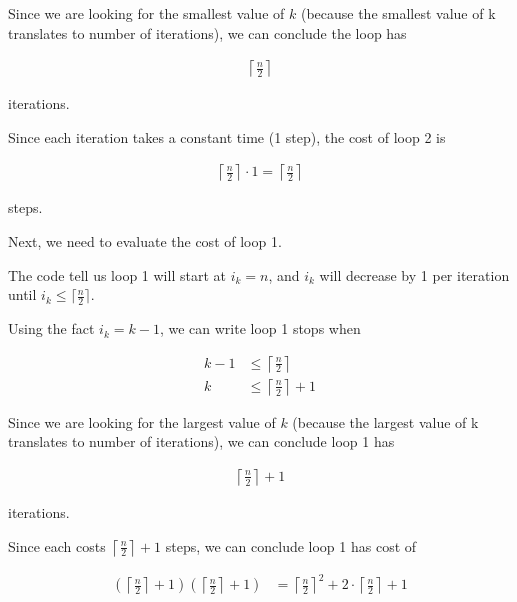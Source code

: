 \documentclass[12pt]{article}
\begin{document}
\begin{enumerate}[a.]
    \bigskip

    Since we are looking for the smallest value of $k$ (because the smallest value of
    k translates to number of iterations), we can conclude the
    loop has

    \begin{align}
        \left\lceil \frac{n}{2} \right\rceil
    \end{align}

    iterations.

    \bigskip

    Since each iteration takes a constant time (1 step), the cost of loop 2
    is

    \begin{align}
        \left\lceil \frac{n}{2} \right\rceil \cdot 1 = \left\lceil \frac{n}{2} \right\rceil
    \end{align}

    steps.

    \bigskip

    Next, we need to evaluate the cost of loop 1.

    \bigskip

    The code tell us loop 1 will start at $i_k = n$, and $i_k$ will decrease by 1
    per iteration until $i_k \leq \lceil \frac{n}{2} \rceil$.

    \bigskip

    Using the fact $i_k = k - 1$, we can write loop 1 stops when

    \begin{align}
        k - 1 &\leq \left\lceil \frac{n}{2} \right\rceil\\
        k &\leq \left\lceil \frac{n}{2} \right\rceil + 1
    \end{align}

    \bigskip

    Since we are looking for the largest value of $k$ (because the largest value of
    k translates to number of iterations), we can conclude loop 1
    has

    \begin{align}
        \left\lceil \frac{n}{2} \right\rceil + 1
    \end{align}

    iterations.

    \bigskip

    Since each costs $\left\lceil \frac{n}{2} \right\rceil + 1$ steps, we can
    conclude loop 1 has cost of

    \begin{align}
        \left(\left\lceil \frac{n}{2} \right\rceil + 1 \right)\left(\left\lceil \frac{n}{2} \right\rceil + 1 \right) &= \left\lceil \frac{n}{2} \right\rceil^2 + 2 \cdot \left\lceil \frac{n}{2} \right\rceil + 1
    \end{align}


\end{enumerate}
\end{document}
